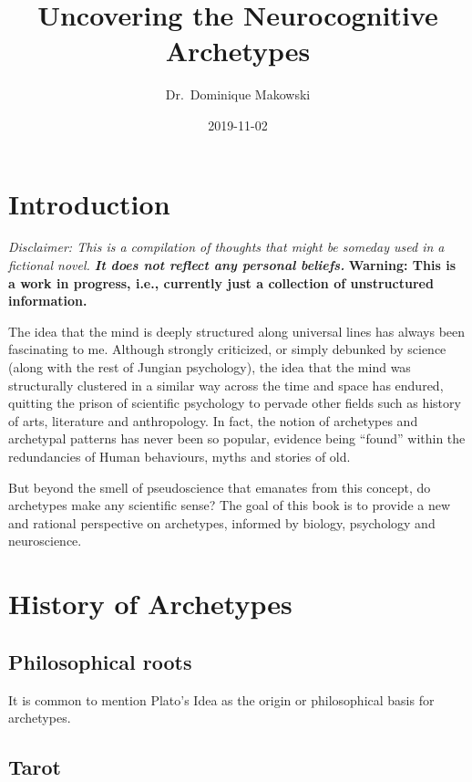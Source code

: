 \documentclass[]{book}
\title{Uncovering the Neurocognitive Archetypes}
\author{Dr.~Dominique Makowski}
\date{2019-11-02}
\begin{document}
\maketitle

{
\setcounter{tocdepth}{1}
\tableofcontents
}
\hypertarget{introduction}{%
\chapter{Introduction}\label{introduction}}

\emph{Disclaimer: This is a compilation of thoughts that might be someday used in a fictional novel. \textbf{It does not reflect any personal beliefs.}}
\textbf{Warning: This is a work in progress, i.e., currently just a collection of unstructured information.}

The idea that the mind is deeply structured along universal lines has always been fascinating to me. Although strongly criticized, or simply debunked by science (along with the rest of Jungian psychology), the idea that the mind was structurally clustered in a similar way across the time and space has endured, quitting the prison of scientific psychology to pervade other fields such as history of arts, literature and anthropology. In fact, the notion of archetypes and archetypal patterns has never been so popular, evidence being ``found'' within the redundancies of Human behaviours, myths and stories of old.

But beyond the smell of pseudoscience that emanates from this concept, do archetypes make any scientific sense? The goal of this book is to provide a new and rational perspective on archetypes, informed by biology, psychology and neuroscience.

\hypertarget{history-of-archetypes}{%
\chapter{History of Archetypes}\label{history-of-archetypes}}

\hypertarget{philosophical-roots}{%
\section{Philosophical roots}\label{philosophical-roots}}

It is common to mention Plato's Idea as the origin or philosophical basis for archetypes.

\hypertarget{tarot}{%
\section{Tarot}\label{tarot}}
\end{document}
